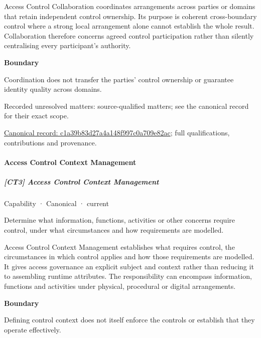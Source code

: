 Access Control Collaboration coordinates arrangements across parties or domains that retain independent control ownership. Its purpose is coherent cross-boundary control where a strong local arrangement alone cannot establish the whole result. Collaboration therefore concerns agreed control participation rather than silently centralising every participant's authority.



\textbf{Boundary}



Coordination does not transfer the parties' control ownership or guarantee identity quality across domains.


{\small Recorded unresolved matters: source-qualified matters; see the canonical record for their exact scope.}\par
{\footnotesize \href{../../../../continuum/strategy/capability/c1a39b83d27a4a148f997c0a709e82ac.md}{Canonical record: c1a39b83d27a4a148f997c0a709e82ac}; full qualifications, contributions and provenance.}\par
\paragraph{Access Control Context Management}

\subparagraph{[CT3] Access Control Context Management}

\label{element:a51f7a8045d24d0f982320025ba3a6ae}
{\small Capability · Canonical · current}\par

Determine what information, functions, activities or other concerns require control, under what circumstances and how requirements are modelled.



Access Control Context Management establishes what requires control, the circumstances in which control applies and how those requirements are modelled. It gives access governance an explicit subject and context rather than reducing it to assembling runtime attributes. The responsibility can encompass information, functions and activities under physical, procedural or digital arrangements.



\textbf{Boundary}



Defining control context does not itself enforce the controls or establish that they operate effectively.



